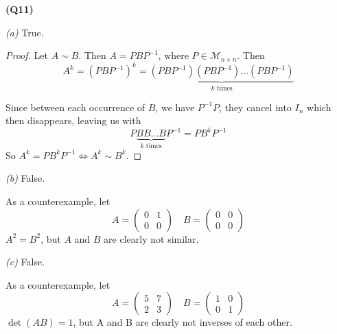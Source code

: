 \documentclass[12pt, a4paper]{article}
\begin{document}
\textbf{(Q11)}

\textit{(a)} True.

\begin{proof}
    Let $A \sim B$. Then $A = PBP^{-1}$, where $P \in \mathcal{M}_{n \times n}$.
    Then
    \[
        A^k = (PBP^{-1})^k = \underbrace{
            (PBP^{-1})(PBP^{-1}) \ldots (PBP^{-1})
        }_{k \text{ times}}
    \]

    Since between each occurrence of $B$, we have $P^{-1}P$, they cancel into $I_n$
    which then disappears, leaving us with
    \[
        P\underbrace{BB \ldots B}_{k \text{ times}}P^{-1} = PB^kP^{-1}
    \]
    So $A^k = PB^kP^{-1} \iff A^k \sim B^k$.
\end{proof}

\textit{(b)} False.

As a counterexample, let
\[
    A = \begin{pmatrix}
        0 & 1\\
        0 & 0
    \end{pmatrix}\quad
    B = \begin{pmatrix}
        0 & 0\\
        0 & 0
    \end{pmatrix}
\]
$A^2 = B^2$, but $A$ and $B$ are clearly not similar.

\textit{(c)} False.

As a counterexample, let
\[
    A = \begin{pmatrix}
        5 & 7\\
        2 & 3
    \end{pmatrix}\quad
    B = \begin{pmatrix}
        1 & 0\\
        0 & 1
    \end{pmatrix}
\]
$\det (AB) = 1$, but A and B are clearly not inverses of each other.
\end{document}
